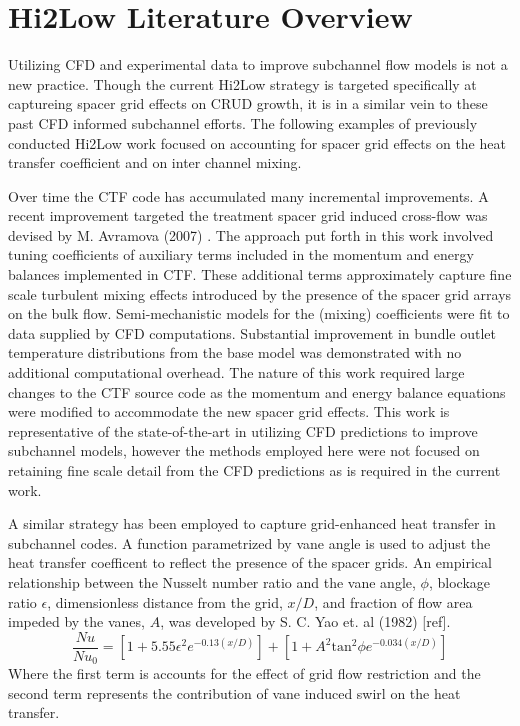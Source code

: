 \section{Hi2Low Literature Overview}

Utilizing CFD and experimental data to improve subchannel flow models is not a new practice.  Though the current Hi2Low strategy is targeted specifically at captureing spacer grid effects on CRUD growth, it is in a similar vein to these past CFD informed subchannel efforts.  The following examples of previously conducted Hi2Low work focused on accounting for spacer grid effects on the heat transfer coefficient and on inter channel mixing. 

Over time the CTF code has accumulated many incremental improvements.  A recent improvement targeted the treatment spacer grid induced cross-flow was devised by M. Avramova (2007) \cite{avramova2007}. 
The approach put forth in this work involved tuning coefficients of auxiliary terms included in the momentum and energy balances implemented in CTF.  These additional terms approximately capture fine scale turbulent mixing effects introduced by the presence of the spacer grid arrays on the bulk flow.  Semi-mechanistic models for the (mixing) coefficients were fit to data supplied by CFD computations.  Substantial improvement in bundle outlet temperature distributions from the base model was demonstrated with no additional computational overhead.  The nature of this work required large changes to the CTF source code as the momentum and energy balance equations were modified to accommodate the new spacer grid effects.   This work is representative of the state-of-the-art in utilizing CFD predictions to improve subchannel models, however the methods employed here were not focused on retaining fine scale detail from the CFD predictions as is required in the current work.

A similar strategy has been employed to capture grid-enhanced heat transfer in subchannel codes.   A function parametrized by vane angle is used to adjust the heat transfer coefficent to reflect the presence of the spacer grids.  An empirical relationship between the Nusselt number ratio and the vane angle, $\phi$, blockage ratio $\epsilon$, dimensionless distance from the grid, $x/D$, and fraction of flow area impeded by the vanes, $A$, was developed by S. C. Yao et. al (1982) [ref].
\begin{equation}
\frac{Nu}{Nu_0}  = \left[ 1 + 5.55 \epsilon^2 e^{-0.13(x/D)}\right] + \left[ 1 + A^2\mathrm{tan}^2\phi e^{-0.034(x/D)} \right]
\end{equation}
Where the first term is accounts for the effect of grid flow restriction and the second term represents the contribution of vane induced swirl on the heat transfer.

